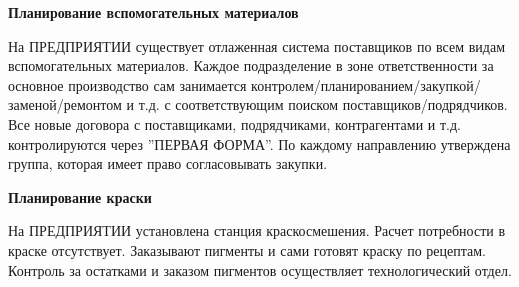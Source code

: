 \textbf{Планирование вспомогательных материалов}



На ПРЕДПРИЯТИИ существует отлаженная система поставщиков по всем видам вспомогательных материалов. Каждое подразделение в зоне ответственности за основное производство сам занимается контролем/планированием/закупкой/заменой/ремонтом и т.д. с соответствующим поиском поставщиков/подрядчиков. Все новые договора с поставщиками, подрядчиками, контрагентами и т.д. контролируются через ''ПЕРВАЯ ФОРМА''. По каждому направлению утверждена группа, которая имеет право согласовывать закупки. 


















\textbf{Планирование краски }


На ПРЕДПРИЯТИИ установлена станция краскосмешения. Расчет потребности в краске отсутствует. Заказывают пигменты и сами готовят краску по рецептам. Контроль за остатками и заказом пигментов осуществляет технологический отдел.  





